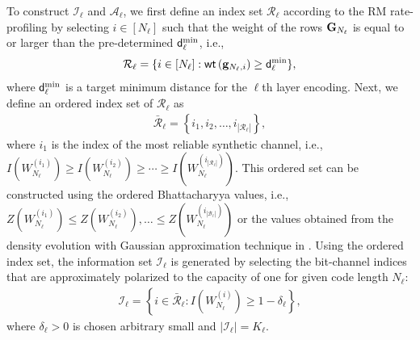 \documentclass[conference]{IEEEtran}
\begin{document}
To construct $\mathcal{I}_{\ell}$ and $\mathcal{A}_{\ell}$, we first define an index set $\mathcal{R}_{\ell}$ according to the RM rate-profiling by selecting $i\in [N_{\ell}]$ such that the weight of the rows ${\bf G}_{N_{\ell}}$ is equal to or larger than the pre-determined ${\sf d}_{\ell}^{\rm min}$, i.e., 
 \begin{align}
	\mathcal{R}_{\ell}=\{i\in [N_{\ell}]:  {\sf wt}\left({\bf g}_{N_{\ell},i} \right)\geq {\sf d}^{\rm min}_{\ell} \},
\end{align}
where ${\sf d}^{\rm min}_{\ell}$ is a target minimum distance for the $\ell$th layer encoding. Next, we define an ordered index set of $\mathcal{R}_{\ell}$ as
\begin{align}
    \mathcal{\bar R}_{\ell}=\left\{i_1,i_2,\ldots, i_{|\mathcal{R}_{\ell}|}\right\},
\end{align}
 where $i_1$ is the index of the most reliable synthetic channel, i.e., $ I\left(W_{N_{\ell}}^{(i_1)}\right) \geq I\left(W_{N_{\ell}}^{(i_2)}\right)\geq \cdots \geq I\left(W_{N_{\ell}}^{(i_{|\mathcal{R}_{\ell}|})}\right)$. This ordered set can be constructed using the ordered Bhattacharyya values, i.e., $Z\left(W_{N_{\ell}}^{(i_1)}\right)\leq Z\left(W_{N_{\ell}}^{(i_2)}\right),\ldots \leq Z\left(W_{N_{\ell}}^{(i_{|\mathcal{B}_{\ell}|})}\right)$ or the values obtained from the density evolution with Gaussian approximation technique in \cite{Tal-polar-construction, Trifnov-polar-construction}.  Using the ordered index set, the information set $\mathcal{I}_{\ell}$ is generated by selecting the bit-channel indices that are approximately polarized to the capacity of one for given code length $N_{\ell}$:
\begin{align}
	\mathcal{I}_{\ell}=\left\{i\in \mathcal{\bar R}_{\ell}: I\left(W_{N_{\ell}}^{(i)}\right) \geq 1-\delta_{\ell} \right\},
\end{align}
where $\delta_{\ell}>0$ is chosen arbitrary small and $|\mathcal{I}_{\ell}|=K_{\ell}$.



 
\end{document}
